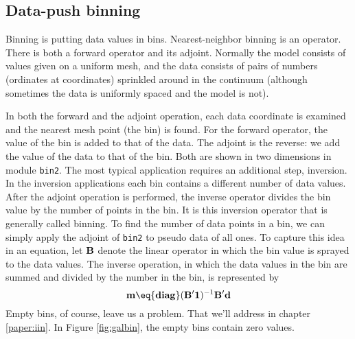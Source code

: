 \subsection{Data-push binning}
Binning is putting data values in bins.
Nearest-neighbor binning is an operator.
There is both a forward operator and its adjoint.
Normally the model consists of values given on a uniform mesh,
and the data consists of pairs of numbers (ordinates at coordinates)
sprinkled around in the continuum
(although sometimes the data is uniformly spaced and the model is not).
\par
In both the forward and the adjoint operation,
each data coordinate is examined
and the nearest mesh point (the bin) is found.
For the forward operator,
the value of the bin is added to that of the data.
The adjoint is the reverse:
we add the value of the data to that of the bin.
Both are shown in two dimensions in module \texttt{bin2}.
The most typical application requires an additional step, inversion.
In the inversion applications
each bin contains a different number of data values.
After the adjoint operation is performed,
the inverse operator divides the bin value
by the number of points in the bin.
It is this inversion operator that is generally called binning.
To find the number of data points in a bin,
we can simply apply the adjoint of \texttt{bin2} to pseudo data of all ones.
To capture this idea in an equation,
let $\bold B$ denote the linear operator
in which the bin value is sprayed to the data values.
The inverse operation,
in which the data values in the bin are summed
and divided by the number in the bin, is represented by
\begin{equation}
\bold m \eq {\bf diag}( \bold B' \bold 1)^{-1} \bold B' \bold d
\label{eqn:dpbin}
\end{equation}
Empty bins, of course, leave us a problem.
That we'll address in chapter \ref{paper:iin}.
In Figure \ref{fig:galbin}, the empty bins contain zero values.

